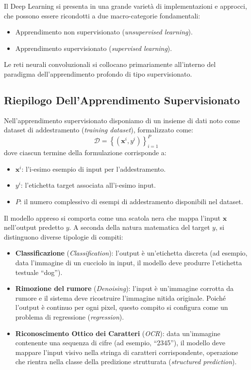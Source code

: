 ﻿\documentclass[11pt, a4paper]{article}
\begin{document}
Il Deep Learning si presenta in una grande varietà di implementazioni e approcci, che possono essere ricondotti a due macro-categorie fondamentali:
\begin{itemize}[noitemsep]
    \item Apprendimento non supervisionato (\emph{unsupervised learning}).
    \item Apprendimento supervisionato (\emph{supervised learning}).
\end{itemize}
Le reti neurali convoluzionali si collocano primariamente all'interno del paradigma dell'apprendimento profondo di tipo supervisionato.

\subsection{Riepilogo Dell'Apprendimento Supervisionato}

Nell'apprendimento supervisionato disponiamo di un insieme di dati noto come dataset di addestramento (\emph{training dataset}), formalizzato come:
\[ \mathcal{D} = \left\{ \left(\bm{x}^i, y^i\right) \right\}_{i=1}^P \]
dove ciascun termine della formulazione corrisponde a:
\begin{itemize}[noitemsep]
    \item $\bm{x}^i$: l'i-esimo esempio di input per l'addestramento.
    \item $y^i$: l'etichetta target associata all'i-esimo input.
    \item $P$: il numero complessivo di esempi di addestramento disponibili nel dataset.
\end{itemize}


Il modello appreso si comporta come una scatola nera che mappa l'input $\bm{x}$ nell'output predetto $y$. A seconda della natura matematica del target $y$, si distinguono diverse tipologie di compiti:
\begin{itemize}
    \item \textbf{Classificazione} (\emph{Classification}): l'output è un'etichetta discreta (ad esempio, data l'immagine di un cucciolo in input, il modello deve produrre l'etichetta testuale \enquote{dog}).
    \item \textbf{Rimozione del rumore} (\emph{Denoising}): l'input è un'immagine corrotta da rumore e il sistema deve ricostruire l'immagine nitida originale. Poiché l'output è continuo per ogni pixel, questo compito si configura come un problema di regressione (\emph{regression}).
    \item \textbf{Riconoscimento Ottico dei Caratteri} (\emph{OCR}): data un'immagine contenente una sequenza di cifre (ad esempio, \enquote{2345}), il modello deve mappare l'input visivo nella stringa di caratteri corrispondente, operazione che rientra nella classe della predizione strutturata (\emph{structured prediction}).
\end{itemize}
\end{document}
